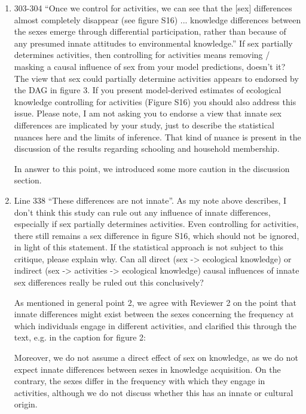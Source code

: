 \documentclass{article}
\newcommand{\rev}[1]{{\color{Red}#1}}
\newcommand{\comment}[1]{{\color{Blue}#1}}
\begin{document}
\begin{enumerate}
    \item 303-304 “Once we control for activities, we can see that the [sex] differences almost completely disappear (see figure S16) ... knowledge differences between the sexes emerge through differential participation, rather than because of any presumed innate attitudes to environmental knowledge.” If sex partially determines activities, then controlling for activities means removing / masking a causal influence of sex from your model predictions, doesn’t it? The view that sex could partially determine activities appears to endorsed by the DAG in figure 3. If you present model-derived estimates of ecological knowledge controlling for activities (Figure S16) you should also address this issue. Please note, I am not asking you to endorse a view that innate sex differences are implicated by your study, just to describe the statistical nuances here and the limits of inference. That kind of nuance is present in the discussion of the results regarding schooling and household membership.
    
    \comment{In answer to this point, we introduced some more caution in the discussion section.}

    \item Line 338 “These differences are not innate”. As my note above describes, I don’t think this study can rule out any influence of innate differences, especially if sex partially determines activities. Even controlling for activities, there still remains a sex difference in figure S16, which should not be ignored, in light of this statement. If the statistical approach is not subject to this critique, please explain why. Can all direct (sex -> ecological knowledge) or indirect (sex -> activities -> ecological knowledge) causal influences of innate sex differences really be ruled out this conclusively?
    
    \comment{As mentioned in general point 2, we agree with Reviewer 2 on the point that innate differences might exist between the sexes concerning the frequency at which individuals engage in different activities, and clarified this through the text, e.g. in  the caption for figure 2:}
    
    \rev{Moreover, we do not assume a direct effect of sex on knowledge, as we do not expect innate differences between sexes in knowledge acquisition. On the contrary, the sexes differ in the frequency with which they engage in activities, although we do not discuss whether this has an innate or cultural origin.}
    

\end{enumerate}
\end{document}
